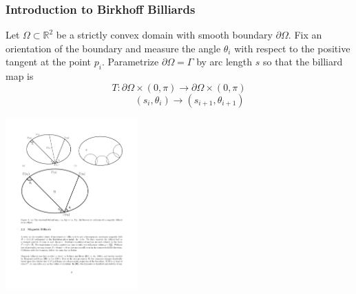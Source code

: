 \documentclass[compress,aspectratio=169,10pt,usenames,dvipsnames]{beamer}
\begin{document}
\begin{frame}
\frametitle{Introduction to Birkhoff Billiards}

Let $\Omega \subset \mathbb{R}^{2}$ be a strictly convex domain with smooth boundary $\partial\Omega$. Fix an orientation of the boundary and measure the angle $\theta_i$ with respect to the positive tangent at the point $p_i$. Parametrize $\partial \Omega = \Gamma$ by arc length $s$ so that the billiard map is 
$$T: \partial \Omega \times (0,\pi) \longrightarrow \partial \Omega \times (0,\pi)$$ $$\;\;\;\;\;\;\;\;(s_i,\theta_i) \longrightarrow (s_{i+1},\theta_{i+1})$$

\vskip5pt

\begin{center}
\includegraphics[width = 0.38\textwidth]{BilliardMap}
\end{center}

\end{frame}


%
%


\end{document}
